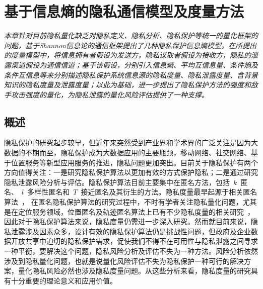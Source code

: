 \chapter{基于信息熵的隐私通信模型及度量方法}
\label{chap:entropy-metric-model}

\textit{ }

\textit{本章针对目前隐私量化缺乏对隐私定义、隐私分析、隐私保护等统一的量化框架的问题，基于Shannon信息论的通信框架提出了几种隐私保护信息熵模型\cite{peng2016privacy}。在所提出的度量模型中，将信息拥有者假设为发送方，隐私谋取者假设为接收方，隐私的泄露渠道假设为通信信道；基于该假设，分别引入信息熵、平均互信息量、条件熵及条件互信息等来分别描述隐私保护系统信息源的隐私度量、隐私泄露度量、含背景知识的隐私度量及泄露度量；以此为基础，进一步提出了隐私保护方法的强度和敌手攻击强度的量化，为隐私泄露的量化风险评估提供了一种支撑。}%

\section{概述}

隐私保护的研究起步较早，但近年来突然受到产业界和学术界的广泛关注是因为大数据的不期而至，隐私保护成为大数据应用的主要瓶颈，移动网络、社交网络、基于位置服务等新型应用服务的推进，隐私问题更加突出。目前关于隐私保护有两个方向值得关注：一是研究隐私保护算法以更加有效的方式保护隐私；二是通过研究隐私泄露风险分析与评估。隐私保护算法目前主要集中在匿名方法，包括~$k$~匿名、~$l$~多样性匿名和~$T$~接近匿名及其衍生的方法。隐私度量最早起源于相关匿名算法~\cite{sweeney2002k}， 在匿名隐私保护算法的研究过程中，不时有学者关注隐私量化问题，尤其是在定位服务领域，位置匿名及轨迹匿名算法上已有不少隐私度量的相关研究~\cite{shokri2011quantifying,olteanu2017quantifying}，因此对于隐私保护算法来说，隐私度量仍需进一步深入研究。然而就目前来说，隐私泄露涉及因素众多，设计有效的隐私保护算法仍是挑战性问题，但政府及企业数据开放共享中迫切的隐私保护需求，促使我们不得不在可用性与隐私泄露之间寻求一种平衡，要解决这个问题，隐私风险分析及评估不失为一种方法。风险分析依然涉及到隐私量化问题，也就是说量化风险评估不失为隐私保护一种可行的解决方案，量化隐私风险必然也涉及隐私度量问题。从这些分析来看，隐私度量的研究具有十分重要的理论意义和应用价值。


